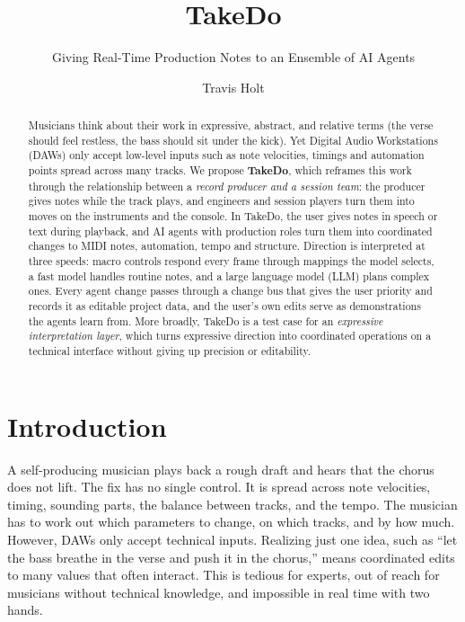 \documentclass[sigconf,nonacm]{acmart}
\newcommand{\projectname}{TakeDo}
\begin{document}
\title{\projectname{}}
\subtitle{Giving Real-Time Production Notes to an Ensemble of AI Agents}

\author{Travis Holt}

\begin{abstract}
Musicians think about their work in expressive, abstract, and relative terms (the verse should feel restless, the bass should sit under the kick). Yet Digital Audio Workstations (DAWs) only accept low-level inputs such as note velocities, timings and automation points spread across many tracks.
We propose \textbf{\projectname{}}, which reframes this work through the relationship between a \emph{record producer and a session team}: the producer gives notes while the track plays, and engineers and session players turn them into moves on the instruments and the console.
In \projectname{}, the user gives notes in speech or text during playback, and AI agents with production roles turn them into coordinated changes to MIDI notes, automation, tempo and structure. Direction is interpreted at three speeds: macro controls respond every frame through mappings the model selects, a fast model handles routine notes, and a large language model (LLM) plans complex ones. Every agent change passes through a change bus that gives the user priority and records it as editable project data, and the user's own edits serve as demonstrations the agents learn from.
More broadly, \projectname{} is a test case for an \emph{expressive interpretation layer}, which turns expressive direction into coordinated operations on a technical interface without giving up precision or editability.
\end{abstract}

\maketitle

\section{Introduction}

A self-producing musician plays back a rough draft and hears that the chorus does not lift. The fix has no single control. It is spread across note velocities, timing, sounding parts, the balance between tracks, and the tempo. The musician has to work out which parameters to change, on which tracks, and by how much. However, DAWs only accept technical inputs. Realizing just one idea, such as ``let the bass breathe in the verse and push it in the chorus,'' means coordinated edits to many values that often interact. This is tedious for experts, out of reach for musicians without technical knowledge, and impossible in real time with two hands.
\end{document}
